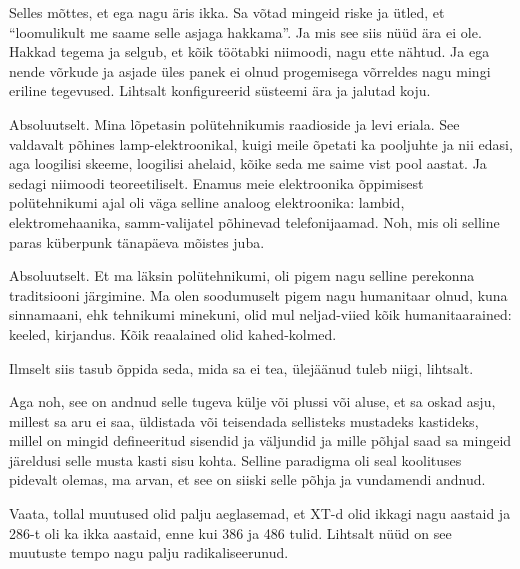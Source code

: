 
Selles mõttes, et ega nagu äris ikka. Sa võtad mingeid riske ja ütled, et \enquote{loomulikult me saame selle asjaga hakkama}. Ja mis see siis nüüd ära ei ole. Hakkad tegema ja  selgub, et  kõik töötabki niimoodi, nagu ette nähtud.
Ja ega  nende võrkude ja asjade üles panek ei olnud  progemisega võrreldes nagu mingi eriline tegevused. Lihtsalt konfigureerid süsteemi ära ja jalutad koju.


Absoluutselt. Mina lõpetasin polütehnikumis raadioside ja levi eriala. See valdavalt põhines lamp-elektroonikal, kuigi meile õpetati ka pooljuhte ja nii edasi, aga loogilisi skeeme, loogilisi ahelaid, kõike seda me saime vist pool aastat. Ja sedagi niimoodi teoreetiliselt. Enamus  meie  elektroonika õppimisest polütehnikumi ajal oli väga selline analoog elektroonika: lambid, elektromehaanika, samm-valijatel põhinevad telefonijaamad. Noh, mis oli selline paras küberpunk tänapäeva mõistes juba. 


Absoluutselt. Et ma läksin polütehnikumi, oli pigem nagu selline perekonna traditsiooni järgimine. Ma olen soodumuselt pigem nagu humanitaar olnud, kuna sinnamaani, ehk tehnikumi minekuni, olid mul neljad-viied kõik humanitaarained: keeled, kirjandus. Kõik reaalained olid kahed-kolmed.

Ilmselt siis tasub õppida seda, mida sa ei tea, ülejäänud tuleb niigi, lihtsalt. 

Aga noh, see on andnud  selle tugeva külje või plussi või aluse, et sa oskad asju, millest sa aru ei saa, üldistada või teisendada sellisteks mustadeks kastideks, millel on mingid defineeritud sisendid ja väljundid ja mille põhjal saad sa mingeid järeldusi  selle musta kasti sisu kohta. Selline paradigma oli seal koolituses pidevalt olemas, ma arvan, et see on siiski selle põhja ja vundamendi andnud.
                 

Vaata, tollal muutused olid palju aeglasemad, et XT-d olid ikkagi nagu aastaid ja 286-t oli ka ikka aastaid, enne kui 386 ja 486 tulid. Lihtsalt nüüd on see muutuste tempo nagu palju radikaliseerunud.
                 
